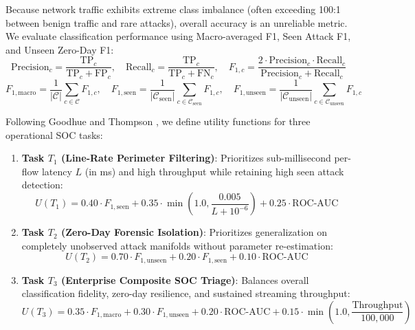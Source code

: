 \documentclass[10pt,a4paper]{article}
\begin{document}
Because network traffic exhibits extreme class imbalance (often exceeding 100:1 between benign traffic and rare attacks), overall accuracy is an unreliable metric. We evaluate classification performance using Macro-averaged F1, Seen Attack F1, and Unseen Zero-Day F1:
\begin{equation}
\text{Precision}_c = \frac{\text{TP}_c}{\text{TP}_c + \text{FP}_c}, \quad \text{Recall}_c = \frac{\text{TP}_c}{\text{TP}_c + \text{FN}_c}, \quad F_{1, c} = \frac{2 \cdot \text{Precision}_c \cdot \text{Recall}_c}{\text{Precision}_c + \text{Recall}_c}
\end{equation}
\begin{equation}
F_{1, \text{macro}} = \frac{1}{|\mathcal{C}|} \sum_{c \in \mathcal{C}} F_{1, c}, \quad F_{1, \text{seen}} = \frac{1}{|\mathcal{C}_{\text{seen}}|} \sum_{c \in \mathcal{C}_{\text{seen}}} F_{1, c}, \quad F_{1, \text{unseen}} = \frac{1}{|\mathcal{C}_{\text{unseen}}|} \sum_{c \in \mathcal{C}_{\text{unseen}}} F_{1, c}
\end{equation}

Following Goodhue and Thompson \cite{goodhue1995task}, we define utility functions for three operational SOC tasks:
\begin{enumerate}
    \item \textbf{Task $T_1$ (Line-Rate Perimeter Filtering)}: Prioritizes sub-millisecond per-flow latency $L$ (in ms) and high throughput while retaining high seen attack detection:
    \begin{equation}
    U(T_1) = 0.40 \cdot F_{1, \text{seen}} + 0.35 \cdot \min\left(1.0, \frac{0.005}{L + 10^{-6}}\right) + 0.25 \cdot \text{ROC-AUC}
    \end{equation}
    \item \textbf{Task $T_2$ (Zero-Day Forensic Isolation)}: Prioritizes generalization on completely unobserved attack manifolds without parameter re-estimation:
    \begin{equation}
    U(T_2) = 0.70 \cdot F_{1, \text{unseen}} + 0.20 \cdot F_{1, \text{seen}} + 0.10 \cdot \text{ROC-AUC}
    \end{equation}
    \item \textbf{Task $T_3$ (Enterprise Composite SOC Triage)}: Balances overall classification fidelity, zero-day resilience, and sustained streaming throughput:
    \begin{equation}
    U(T_3) = 0.35 \cdot F_{1, \text{macro}} + 0.30 \cdot F_{1, \text{unseen}} + 0.20 \cdot \text{ROC-AUC} + 0.15 \cdot \min\left(1.0, \frac{\text{Throughput}}{100,000}\right)
    \end{equation}
\end{enumerate}
\end{document}
